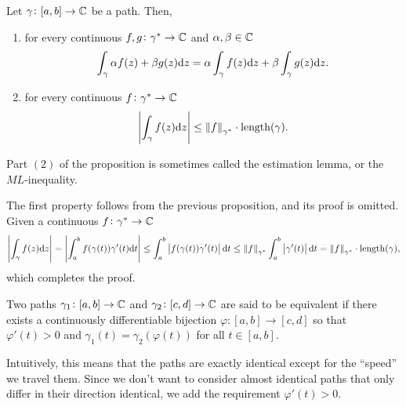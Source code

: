 \documentclass[11pt,a4paper]{article}
\begin{document}
\begin{proposition}
  \label{prop:pathint-bound}
  Let $\gamma \colon [a, b] \to \mathbb{C}$ be a path. Then,
  \begin{enumerate}
    \item[(1)] for every continuous $f, g \colon \gamma^* \to \mathbb{C}$ and 
      $\alpha, \beta \in \mathbb{C}$
      \[
        \int_{\gamma} \alpha f(z) + \beta g(z) \mathrm{d} z =
        \alpha \int_{\gamma} f(z) \mathrm{d} z +
        \beta \int_{\gamma} g(z) \mathrm{d} z.
      \]
    \item[(2)] for every continuous $f \colon \gamma^* \to \mathbb{C}$
      \[
        \left\lvert\int_{\gamma} f(z) \mathrm{d} z\right\rvert \le
        \left\lVert f\right\rVert_{\gamma^*} \cdot \mathrm{length}(\gamma).
      \]
  \end{enumerate}
\end{proposition}
\begin{remark}
  Part $(2)$ of the proposition is sometimes called the estimation lemma,
  or the $ML$-inequality.
\end{remark}
\begin{proofof}{}
  The first property follows from the previous proposition, and its proof is
  omitted.
  Given a continuous $f \colon \gamma^* \to \mathbb{C}$
  \[
    \left\lvert\int_{\gamma} f(z) \mathrm{d} z\right\rvert =
    \left\lvert\int_{a}^{b} f(\gamma(t)) \gamma'(t) \mathrm{d} t\right\rvert \le
    \int_{a}^{b} \left\lvert f(\gamma(t)) \gamma'(t)\right\rvert \mathrm{d} t \le
    \left\lVert f\right\rVert_{\gamma^*} \int_{a}^{b} \left\lvert\gamma'(t)\right\rvert \mathrm{d} t =
    \left\lVert f\right\rVert_{\gamma^*} \cdot \mathrm{length}(\gamma),
  \]
  which completes the proof.
\end{proofof}

\begin{definition}
  Two paths $\gamma_1 \colon [a, b] \to \mathbb{C}$ and 
  $\gamma_2 \colon [c, d] \to \mathbb{C}$ are said to be
  equivalent if there exists a continuously differentiable bijection 
  $\varphi \colon [a, b] \to [c, d]$ so
  that $\varphi'(t) > 0$ and $\gamma_1(t) = \gamma_2(\varphi(t))$
  for all $t \in [a, b]$.
\end{definition}
\begin{remark}
  Intuitively, this means that the paths are exactly identical
  except for the ``speed'' we travel them.
  Since we don't want to consider
  almost identical paths that only differ in their
  direction identical, we add the requirement $\varphi'(t) > 0$.
\end{remark}
\end{document}
